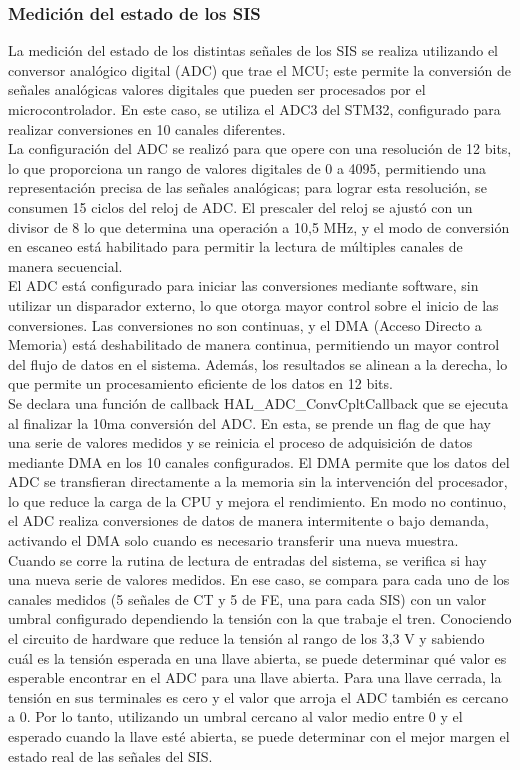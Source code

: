 \subsubsection{Medición del estado de los SIS}


La medición del estado de los distintas señales de los SIS se realiza utilizando el conversor analógico digital (ADC) que trae el MCU; este permite la conversión de señales analógicas valores digitales que pueden ser procesados por el microcontrolador. En este caso, se utiliza el ADC3 del STM32, configurado para realizar conversiones en 10 canales diferentes. \\

La configuración del ADC se realizó para que opere con una resolución de 12 bits, lo que proporciona un rango de valores digitales de 0 a 4095, permitiendo una representación precisa de las señales analógicas; para lograr esta resolución, se consumen 15 ciclos del reloj de ADC. El prescaler del reloj se ajustó con un divisor de 8 lo que determina una operación a 10,5 MHz, y el modo de conversión en escaneo está habilitado para permitir la lectura de múltiples canales de manera secuencial. \\ 

El ADC está configurado para iniciar las conversiones mediante software, sin utilizar un disparador externo, lo que otorga mayor control sobre el inicio de las conversiones. Las conversiones no son continuas, y el DMA (Acceso Directo a Memoria) está deshabilitado de manera continua, permitiendo un mayor control del flujo de datos en el sistema. Además, los resultados se alinean a la derecha, lo que permite un procesamiento eficiente de los datos en 12 bits. \\

Se declara una función de callback HAL\_ADC\_ConvCpltCallback que se ejecuta al finalizar la 10ma conversión del ADC. En esta, se prende un flag de que hay una serie de valores medidos y se reinicia el proceso de adquisición de datos mediante DMA en los 10 canales configurados. El DMA permite que los datos del ADC se transfieran directamente a la memoria sin la intervención del procesador, lo que reduce la carga de la CPU y mejora el rendimiento. En modo no continuo, el ADC realiza conversiones de datos de manera intermitente o bajo demanda, activando el DMA solo cuando es necesario transferir una nueva muestra. \\

Cuando se corre la rutina de lectura de entradas del sistema, se verifica si hay una nueva serie de valores medidos. En ese caso, se compara para cada uno de los canales medidos (5 señales de CT y 5 de FE, una para cada SIS) con un valor umbral configurado dependiendo la tensión con la que trabaje el tren. Conociendo el circuito de hardware que reduce la tensión al rango de los 3,3 V y sabiendo cuál es la tensión esperada en una llave abierta, se puede determinar qué valor es esperable encontrar en el ADC para una llave abierta. Para una llave cerrada, la tensión en sus terminales es cero y el valor que arroja el ADC también es cercano a 0. Por lo tanto, utilizando un umbral cercano al valor medio entre 0 y el esperado cuando la llave esté abierta, se puede determinar con el mejor margen el estado real de las señales del SIS. 